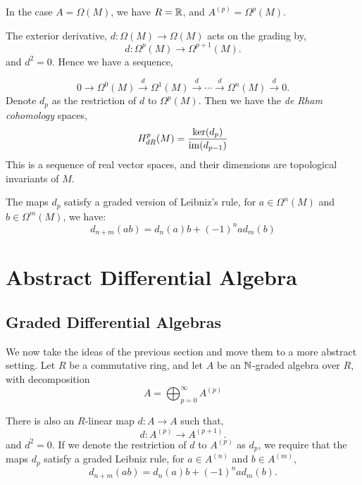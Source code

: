 \documentclass{owmaths}
\begin{document}
In the case $A = \Omega(M)$, we have $R = \mathbb{R}$, and $A^{(p)} = \Omega^p(M)$.

The exterior derivative, $d:\Omega(M)\rightarrow \Omega(M)$ acts on the grading by,
\begin{equation*}
    d:\Omega^p(M) \rightarrow \Omega^{p+1}(M).
\end{equation*}
and $d^2 = 0$. Hence we have a sequence,

\begin{equation*}
    0\rightarrow \Omega^{0}(M) \xrightarrow{d} \Omega^1(M) \xrightarrow{d} \cdots \xrightarrow{d} \Omega^n(M) \xrightarrow{d} 0.
\end{equation*}
Denote $d_p$ as the restriction of $d$ to $\Omega^p(M)$. Then we have the \emph{de Rham cohomology}
spaces,
\begin{equation*}
    H^p_{dR}(M) = \frac{\ker(d_{p})}{\operatorname{im}(d_{p-1})}
\end{equation*}
This is a sequence of real vector spaces, and their dimensions are topological
invariants of $M$.

The maps $d_p$ satisfy a graded version of Leibniz's rule, for $a \in \Omega^n(M)$
and $b \in \Omega^m(M)$, we have:
\begin{equation*}
    d_{n+m}(ab) = d_n(a)b+(-1)^nad_m(b)
\end{equation*}

\section{Abstract Differential Algebra}
\subsection{Graded Differential Algebras}
We now take the ideas of the previous section and move them to a more abstract setting.
Let $R$ be a commutative ring, and let $A$ be an $\mathbb{N}$-graded algebra over $R$, with decomposition
\begin{equation*}
    A = \bigoplus_{p=0}^\infty A^{(p)}
\end{equation*}

There is also an $R$-linear map $d:A\rightarrow A$ such that,
\begin{equation*}
    d:A^{(p)}\rightarrow A^{(p+1)}.
\end{equation*}
and $d^2 = 0$.
If we denote the restriction of $d$ to $A^{(p)}$ as $d_p$, we
require that the maps $d_p$ satisfy a graded Leibniz rule, for $a \in A^{(n)}$
and $b \in A^{(m)}$,
\begin{equation*}
    d_{n+m}(ab) = d_n(a)b+(-1)^nad_m(b).
\end{equation*}
\end{document}
